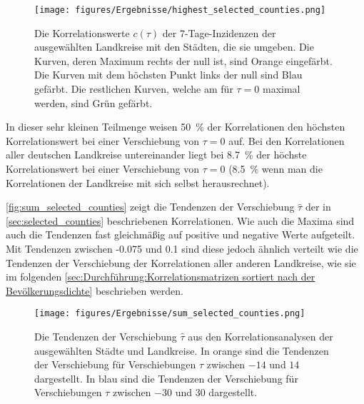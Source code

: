 \begin{figure}[H]
    \centering
    \texttt{[image: figures/Ergebnisse/highest\_selected\_counties.png]}
    \caption{Die Korrelationswerte $c(\tau)$ der 7-Tage-Inzidenzen der ausgewählten Landkreise mit den Städten, die sie umgeben. Die Kurven, deren Maximum rechts der null ist, sind Orange eingefärbt. Die Kurven mit dem höchsten Punkt links der null sind Blau gefärbt. Die restlichen Kurven, welche am für $\tau=0$ maximal werden, sind Grün gefärbt.}
    \label{fig:highest_selected_counties}
\end{figure}

In dieser sehr kleinen Teilmenge weisen 50~\% der Korrelationen den höchsten Korrelationswert bei einer Verschiebung von $\tau = 0$ auf.
Bei den Korrelationen aller deutschen Landkreise untereinander liegt bei 8.7~\% der höchste Korrelationswert bei einer Verschiebung von $\tau= 0$ (8.5~\% wenn man die Korrelationen der Landkreise mit sich selbst herausrechnet).

\autoref{fig:sum_selected_counties} zeigt die Tendenzen der Verschiebung $\hat{\tau}$ der in \autoref{sec:selected_counties} beschriebenen Korrelationen. Wie auch die Maxima sind auch die Tendenzen fast gleichmäßig auf positive und negative Werte aufgeteilt. Mit Tendenzen zwischen -0.075 und 0.1 sind diese jedoch ähnlich verteilt wie die Tendenzen der Verschiebung der Korrelationen aller anderen Landkreise, wie sie im folgenden \autoref{sec:Durchführung:Korrelationsmatrizen sortiert nach der Bevölkerungsdichte} beschrieben werden.
\begin{figure}[H]
    \centering
    \texttt{[image: figures/Ergebnisse/sum\_selected\_counties.png]}
    \caption{Die Tendenzen der Verschiebung $\hat{\tau}$ aus den Korrelationsanalysen der ausgewählten Städte und Landkreise. In orange sind die Tendenzen der Verschiebung für Verschiebungen $\tau$ zwischen $-14$ und $14$ dargestellt. In blau sind die Tendenzen der Verschiebung für Verschiebungen $\tau$ zwischen $-30$ und $30$ dargestellt.}
    \label{fig:sum_selected_counties}
\end{figure}